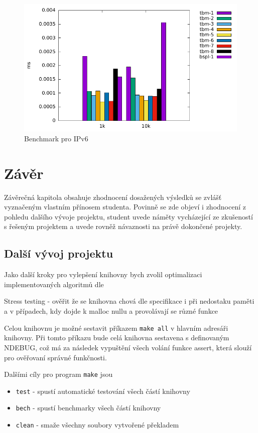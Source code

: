 \begin{figure}[!htb]
\centering
\includegraphics[scale=1]{fig/lpm-ipv6.pdf}
\caption{Benchmark pro IPv6}
\label{fig:lpm-ipv4}
\end{figure}

\chapter{Závěr}
Závěrečná kapitola obsahuje zhodnocení dosažených výsledků se zvlášť vyznačeným vlastním přínosem studenta. Povinně se zde objeví i zhodnocení z pohledu dalšího vývoje projektu, student uvede náměty vycházející ze zkušeností s řešeným projektem a uvede rovněž návaznosti na právě dokončené projekty.

\section{Další vývoj projektu}

Jako další kroky pro vylepšení knihovny bych zvolil optimalizaci implementovaných algoritmů dle

Stress testing
- ověřit že se knihovna chová dle specifikace i při nedostaku paměti a v případech, kdy dojde k malloc nullu
a provolávají se různé funkce


Celou knihovnu je možné sestavit příkazem \texttt{make all} v hlavním adresáři knihovny.
Při tomto příkazu bude celá knihovna sestavena s definovaným NDEBUG, což má za následek vypuštění všech
volání funkce assert, která slouží pro ověřovaní správné funkčnosti.

Dalšími cíly pro program \texttt{make} jsou

\begin{itemize}
	\item{\texttt{test} - spustí automatické testování všech částí knihovny}
	\item{\texttt{bech} - spustí benchmarky všech částí knihovny}
	\item{\texttt{clean} - smaže všechny soubory vytvořené překladem}
\end{itemize}
